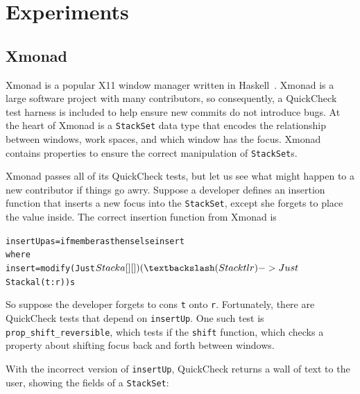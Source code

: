 \documentclass{sigplanconf}
\newenvironment{code}{\begin{alltt}}{\end{alltt}}
\newcommand{\ttp}[1]{\texttt{#1}}
\begin{document}

\section{Experiments}\label{sec:experiments}

\subsection{Xmonad}
Xmonad is a popular X11 window manager written in Haskell~\cite{xmonad}.  Xmonad
is a large software project with many contributors, so consequently, a
QuickCheck test harness is included to help ensure new commits do not introduce
bugs.  At the heart of Xmonad is a \ttp{StackSet} data type that encodes the
relationship between windows, work spaces, and which window has the focus.
Xmonad contains properties to ensure the correct manipulation of
\ttp{StackSet}s.

Xmonad passes all of its QuickCheck tests, but let us see what might happen to a
new contributor if things go awry.  Suppose a developer defines an insertion
function that inserts a new focus into the \ttp{StackSet}, except she forgets to
place the value inside.  The correct insertion function from Xmonad is
%
\begin{code}
insertUp a s = if member a s then s else insert
  where
  insert = modify (Just $ Stack a [] [])
                  (\textbackslash(Stack t l r) ->
                      Just $ Stack a l (t:r)) s
\end{code}
%
\noindent
So suppose the developer forgets to cons \ttp{t} onto \ttp{r}.  Fortunately,
there are QuickCheck tests that depend on \ttp{insertUp}.  One such test is
\ttp{prop\_shift\_reversible}, which tests if the \ttp{shift} function, which
checks a property about shifting focus back and forth between windows.

With the incorrect version of \ttp{insertUp}, QuickCheck returns a wall of text
to the user, showing the fields of a \ttp{StackSet}:
\end{document}
